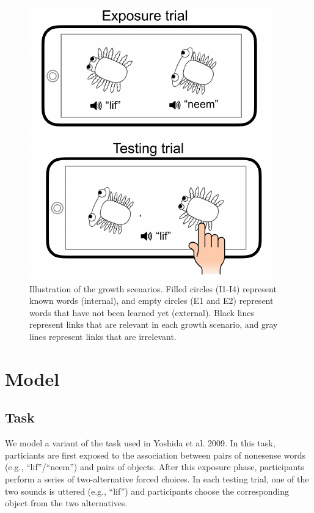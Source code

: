 \documentclass[10pt, letterpaper]{article}
\newenvironment{CodeChunk}{}{}
\begin{document}
\begin{CodeChunk}
\begin{figure}[H]

{\centering \includegraphics{figs/growth-1} 

}

\caption{\label{fig:growth}Illustration of the growth scenarios. Filled circles (I1-I4) represent known words (internal), and empty circles (E1 and E2) represent words that have not been learned yet (external). Black lines represent links that are relevant in each growth scenario, and gray lines represent links that are irrelevant.  }\label{fig:growth}
\end{figure}
\end{CodeChunk}

\section{Model}\label{model}

\subsection{Task}\label{task}

We model a variant of the task used in Yoshida et al. 2009. In this
task, particiants are first exposed to the association between pairs of
nonesense words (e.g., ``lif''/``neem'') and pairs of objects. After
this exposure phase, participants perform a series of two-alternative
forced choices. In each testing trial, one of the two sounds is uttered
(e.g., ``lif'') and participants choose the corresponding object from
the two alternatives.
\end{document}
